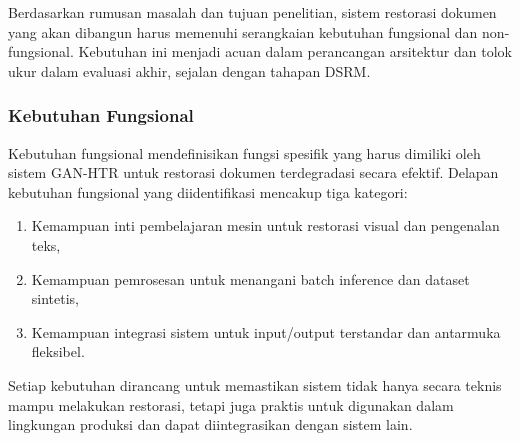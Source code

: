 \documentclass[12pt,a4paper]{article}
\begin{document}
Berdasarkan rumusan masalah dan tujuan penelitian, sistem restorasi dokumen yang akan dibangun harus memenuhi serangkaian kebutuhan fungsional dan non-fungsional. Kebutuhan ini menjadi acuan dalam perancangan arsitektur dan tolok ukur dalam evaluasi akhir, sejalan dengan tahapan DSRM.

\subsubsection{Kebutuhan Fungsional} %

Kebutuhan fungsional mendefinisikan fungsi spesifik yang harus dimiliki oleh sistem GAN-HTR untuk restorasi dokumen terdegradasi secara efektif. Delapan kebutuhan fungsional yang diidentifikasi mencakup tiga kategori:

\begin{enumerate}
    \item Kemampuan inti pembelajaran mesin untuk restorasi visual dan pengenalan teks,
    \item Kemampuan pemrosesan untuk menangani batch inference dan dataset sintetis,
    \item Kemampuan integrasi sistem untuk input/output terstandar dan antarmuka fleksibel.
\end{enumerate}
Setiap kebutuhan dirancang untuk memastikan sistem tidak hanya secara teknis mampu melakukan restorasi, tetapi juga praktis untuk digunakan dalam lingkungan produksi dan dapat diintegrasikan dengan sistem lain.
\end{document}
